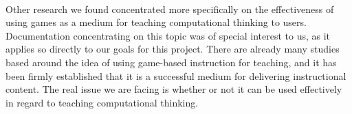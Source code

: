 \\

Other research we found concentrated more specifically on the effectiveness of
using games as a medium for teaching computational thinking to users.
Documentation concentrating on this topic was of special interest to us, as it
applies so directly to our goals for this project. There are already many
studies based around the idea of using game-based instruction for teaching, and
it has been firmly established that it is a successful medium for delivering
instructional content. The real issue we are facing is whether or not it can be
used effectively in regard to teaching computational thinking.\\

